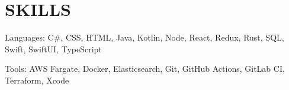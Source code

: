 \section{SKILLS}
\begin{bulletlist}
   \item{Languages: C\#, CSS, HTML, Java, Kotlin, Node, React, Redux, Rust, SQL, Swift, SwiftUI, TypeScript}
   \item{Tools: AWS Fargate, Docker, Elasticsearch, Git, GitHub Actions, GitLab CI, Terraform, Xcode}
\end{bulletlist}
